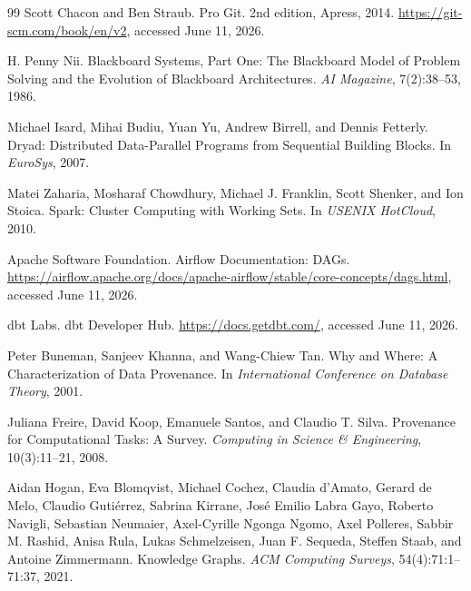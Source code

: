\documentclass{article}
\begin{document}
\begin{thebibliography}{99}
Scott Chacon and Ben Straub.
\newblock Pro Git.
\newblock 2nd edition, Apress, 2014.
\newblock \url{https://git-scm.com/book/en/v2}, accessed June 11, 2026.

H. Penny Nii.
\newblock Blackboard Systems, Part One: The Blackboard Model of Problem Solving and the Evolution of Blackboard Architectures.
\newblock \emph{AI Magazine}, 7(2):38--53, 1986.

Michael Isard, Mihai Budiu, Yuan Yu, Andrew Birrell, and Dennis Fetterly.
\newblock Dryad: Distributed Data-Parallel Programs from Sequential Building Blocks.
\newblock In \emph{EuroSys}, 2007.

Matei Zaharia, Mosharaf Chowdhury, Michael J. Franklin, Scott Shenker, and Ion Stoica.
\newblock Spark: Cluster Computing with Working Sets.
\newblock In \emph{USENIX HotCloud}, 2010.

Apache Software Foundation.
\newblock Airflow Documentation: DAGs.
\newblock \url{https://airflow.apache.org/docs/apache-airflow/stable/core-concepts/dags.html}, accessed June 11, 2026.

dbt Labs.
\newblock dbt Developer Hub.
\newblock \url{https://docs.getdbt.com/}, accessed June 11, 2026.

Peter Buneman, Sanjeev Khanna, and Wang-Chiew Tan.
\newblock Why and Where: A Characterization of Data Provenance.
\newblock In \emph{International Conference on Database Theory}, 2001.

Juliana Freire, David Koop, Emanuele Santos, and Claudio T. Silva.
\newblock Provenance for Computational Tasks: A Survey.
\newblock \emph{Computing in Science \& Engineering}, 10(3):11--21, 2008.

Aidan Hogan, Eva Blomqvist, Michael Cochez, Claudia d'Amato, Gerard de Melo, Claudio Guti\'errez, Sabrina Kirrane, Jos\'e Emilio Labra Gayo, Roberto Navigli, Sebastian Neumaier, Axel-Cyrille Ngonga Ngomo, Axel Polleres, Sabbir M. Rashid, Anisa Rula, Lukas Schmelzeisen, Juan F. Sequeda, Steffen Staab, and Antoine Zimmermann.
\newblock Knowledge Graphs.
\newblock \emph{ACM Computing Surveys}, 54(4):71:1--71:37, 2021.

\end{thebibliography}
\end{document}
